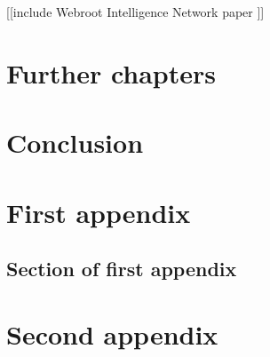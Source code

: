 \documentclass{mproj}
\begin{document}
[[include Webroot Intelligence Network paper \cite{webroot}]]



\chapter{Further chapters}


\chapter{Conclusion}\label{conclusion}

\appendix %
\chapter{First appendix}

\section{Section of first appendix}

\chapter{Second appendix}



\end{document}
